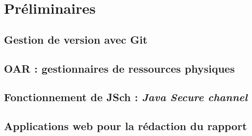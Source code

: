 
\section{Préliminaires}
\label{sec:preliminaires}

\subsection{Gestion de version avec Git}
\label{sec:gestion-de-version}



\subsection{OAR : gestionnaires de ressources physiques}
\label{sec:oar-:-resume}


\label{sec:oar-gestionnaire-res}

\subsection{Fonctionnement de JSch : \emph{Java Secure channel}}
\label{sec:fonct-jsch}



\subsection{Applications web pour la rédaction du rapport}
\label{sec:app-web-rapport}





